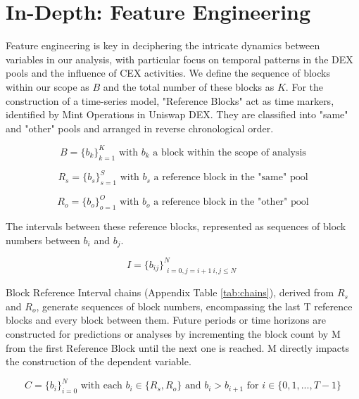 \documentclass{article}
\begin{document}
\section{\textbf{In-Depth: Feature Engineering}}

Feature engineering is key in deciphering the intricate dynamics between variables in our analysis, with particular focus on temporal patterns in the DEX pools and the influence of CEX activities. We define the sequence of blocks within our scope as $B$ and the total number of these blocks as $K$. For the construction of a time-series model, "Reference Blocks" act as time markers, identified by Mint Operations in Uniswap DEX. They are classified into "same" and "other" pools and arranged in reverse chronological order.

\begin{equation}
B = \{b_k\}_{k=1}^{K} \text{ with } b_k \text{ a block within the scope of analysis}
\end{equation}

\begin{equation}
R_{s} = \{b_{s}\}_{s=1}^{S} \text{ with } b_{s} \text{ a reference block in the "same" pool}
\end{equation}

\begin{equation}
R_{o} = \{b_{o}\}_{o=1}^{O} \text{ with } b_{o} \text{ a reference block in the "other" pool}
\end{equation}

The intervals between these reference blocks, represented as sequences of block numbers between $b_i$ and $b_j$. 

\begin{equation}
I = \{b_{ij}\}_{\substack{i=0,j=i+1 \ i,j\leq N}}^N
\end{equation}

Block Reference Interval chains (Appendix Table \ref{tab:chains}), derived from \(R_{s}\) and \(R_{o}\), generate sequences of block numbers, encompassing the last T reference blocks and every block between them. Future periods or time horizons are constructed for predictions or analyses by incrementing the block count by M from the first Reference Block until the next one is reached. M directly impacts the construction of the dependent variable.

\begin{equation}
C = \{b_{i}\}_{i=0}^{N} \text{ with each } b_{i} \in \{R_s, R_o\} \text{ and } b_{i} > b_{i+1} \text{ for } i \in \{0,1,...,T-1\}
\end{equation}
\end{document}
